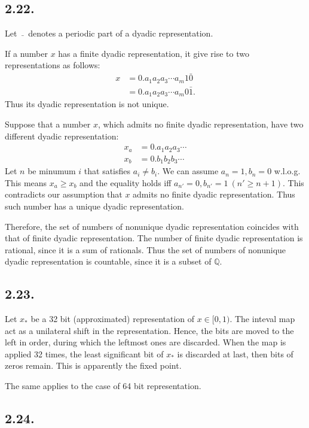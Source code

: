 \documentclass[a4paper,11pt,fleqn]{article}
\begin{document}
\hruleskip

\subsection{2.22.}
Let $\ \bar{} \ $ denotes a periodic part of a dyadic representation.  

If a number $x$ has a finite dyadic representation, it give rise to two representations as follows: 
\begin{align}
    x & = 0.a_1a_2a_3\cdots a_m 1 \bar{0} \nonumber \\
      & = 0.a_1a_2a_3\cdots a_m 0 \bar{1}. 
\end{align}
Thus its dyadic representation is not unique. 

Suppose that a number $x$, which admits no finite dyadic representation, have two different dyadic representation: 
\begin{align}
    x_a & = 0.a_1a_2a_3\cdots \nonumber \\
    x_b  & = 0.b_1b_2b_3\cdots  
\end{align}
Let $n$ be minumum $i$ that satisfies $a_i \neq b_i$. We can assume $a_n = 1, b_n = 0$ w.l.o.g. This means $x_a \ge x_b$ and the equality holds iff $a_{n'}=0, b_{n'} = 1 \ (n' \ge n+1)$. This contradicts our assumption that $x$ admits no finite dyadic representation. Thus such number has a unique dyadic representation. 

Therefore, the set of numbers of nonunique dyadic representation coincides with that of finite dyadic representation. The number of finite dyadic representation is rational, since it is a sum of rationals. Thus the set of numbers of nonunique dyadic representation is countable, since it is a subset of $\mathbb{Q}$. 
\hruleskip

\subsection{2.23.}

Let $x_*$ be a 32 bit (approximated) representation of $x\in [0,1)$. The inteval map act as a unilateral shift in the representation. Hence, the bits are moved to the left in order, during which the leftmost ones are discarded. When the map is applied 32 times, the least significant bit of $x_*$ is discarded at last, then bits of zeros remain. This is apparently the fixed point. 

The same applies to the case of 64 bit representation. 
\hruleskip

\subsection{2.24.}
\end{document}
